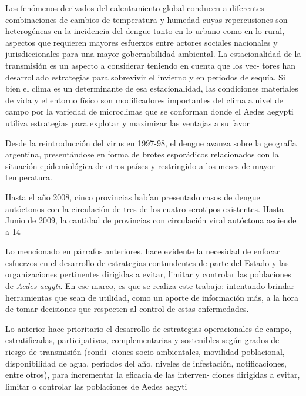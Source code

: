 Los fenómenos derivados del calentamiento global conducen a diferentes combinaciones de
cambios  de  temperatura  y  humedad  cuyas  repercusiones  son  heterogéneas  en  la  incidencia
del  dengue  tanto  en  lo  urbano  como  en  lo  rural,  aspectos  que  requieren  mayores  esfuerzos
entre actores sociales nacionales y jurisdiccionales para una mayor gobernabilidad ambiental.
La estacionalidad de la transmisión es un aspecto a considerar teniendo en cuenta que los vec-
tores han desarrollado estrategias para sobrevivir el invierno y en periodos de sequía. Si bien el
clima es un determinante de esa estacionalidad, las condiciones materiales de vida y el  entorno
físico son modificadores importantes del clima a nivel de campo por la variedad de microclimas
que se conforman donde el Aedes aegypti utiliza estrategias para explotar y maximizar las ventajas a su favor


Desde la reintroducción del virus en 1997-98, el dengue avanza sobre la geografía argentina,
presentándose en forma de brotes esporádicos relacionados con la situación epidemiológica
de otros países y restringido a los meses de mayor temperatura.



Hasta  el  año  2008,  cinco  provincias  habían  presentado  casos  de  dengue  autóctonos  con  la
circulación de tres de los cuatro serotipos existentes. Hasta Junio de 2009, la
cantidad de provincias con circulación viral autóctona asciende a 14



Lo mencionado en párrafos anteriores, hace evidente la necesidad de enfocar esfuerzos
en el desarrollo de estrategias contundentes de parte del Estado y las organizaciones
pertinentes dirigidas a evitar, limitar y controlar las poblaciones de \textit{Aedes aegyti}.
En ese marco, es que se realiza este trabajo: intentando brindar herramientas
que sean de utilidad, como un aporte de información más, a la hora de tomar
decisiones que respecten al control de estas enfermedades.

Lo anterior hace prioritario el desarrollo de  estrategias operacionales de campo, estratificadas,
participativas,  complementarias  y  sostenibles  según  grados  de  riesgo  de  transmisión  (condi-
ciones  socio-ambientales,  movilidad  poblacional,  disponibilidad  de  agua,  períodos  del  año,
niveles de infestación, notificaciones, entre otros), para incrementar la eficacia de las interven-
ciones dirigidas a evitar, limitar o controlar las poblaciones de
Aedes aegyti



